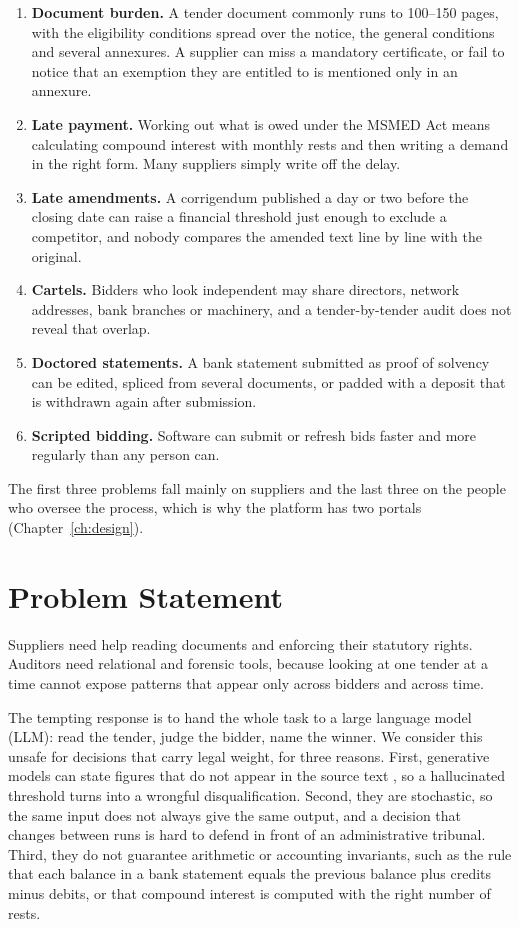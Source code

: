 \begin{enumerate}
    \item \textbf{Document burden.} A tender document commonly runs to 100--150 pages, with the eligibility conditions spread over the notice, the general conditions and several annexures. A supplier can miss a mandatory certificate, or fail to notice that an exemption they are entitled to is mentioned only in an annexure.
    \item \textbf{Late payment.} Working out what is owed under the MSMED Act means calculating compound interest with monthly rests and then writing a demand in the right form. Many suppliers simply write off the delay.
    \item \textbf{Late amendments.} A corrigendum published a day or two before the closing date can raise a financial threshold just enough to exclude a competitor, and nobody compares the amended text line by line with the original.
    \item \textbf{Cartels.} Bidders who look independent may share directors, network addresses, bank branches or machinery, and a tender-by-tender audit does not reveal that overlap.
    \item \textbf{Doctored statements.} A bank statement submitted as proof of solvency can be edited, spliced from several documents, or padded with a deposit that is withdrawn again after submission.
    \item \textbf{Scripted bidding.} Software can submit or refresh bids faster and more regularly than any person can.
\end{enumerate}

The first three problems fall mainly on suppliers and the last three on the people who oversee the process, which is why the platform has two portals (Chapter~\ref{ch:design}).

\section{Problem Statement}
Suppliers need help reading documents and enforcing their statutory rights. Auditors need relational and forensic tools, because looking at one tender at a time cannot expose patterns that appear only across bidders and across time.

The tempting response is to hand the whole task to a large language model (LLM): read the tender, judge the bidder, name the winner. We consider this unsafe for decisions that carry legal weight, for three reasons. First, generative models can state figures that do not appear in the source text \cite{ji2023survey}, so a hallucinated threshold turns into a wrongful disqualification. Second, they are stochastic, so the same input does not always give the same output, and a decision that changes between runs is hard to defend in front of an administrative tribunal. Third, they do not guarantee arithmetic or accounting invariants, such as the rule that each balance in a bank statement equals the previous balance plus credits minus debits, or that compound interest is computed with the right number of rests.

